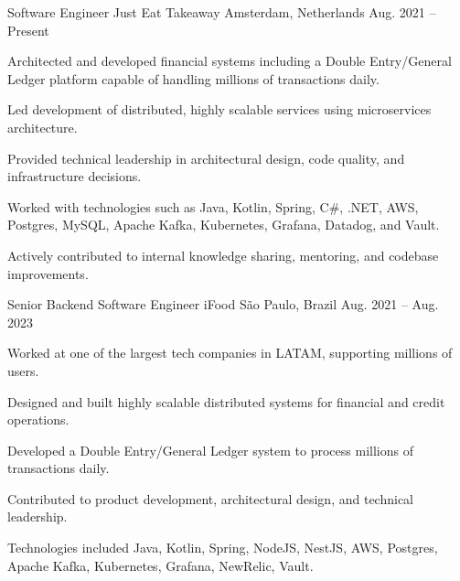 
\begin{cventries}

  \cventry
    {Software Engineer} %
    {Just Eat Takeaway} %
    {Amsterdam, Netherlands} %
    {Aug. 2021 -- Present} %
    {
      \begin{cvitems} %
        \item {Architected and developed financial systems including a Double Entry/General Ledger platform capable of handling millions of transactions daily.}
        \item {Led development of distributed, highly scalable services using microservices architecture.}
        \item {Provided technical leadership in architectural design, code quality, and infrastructure decisions.}
        \item {Worked with technologies such as Java, Kotlin, Spring, C\#, .NET, AWS, Postgres, MySQL, Apache Kafka, Kubernetes, Grafana, Datadog, and Vault.}
        \item {Actively contributed to internal knowledge sharing, mentoring, and codebase improvements.}
      \end{cvitems}
    }

  \cventry
    {Senior Backend Software Engineer} %
    {iFood} %
    {São Paulo, Brazil} %
    {Aug. 2021 -- Aug. 2023} %
    {
      \begin{cvitems} %
        \item {Worked at one of the largest tech companies in LATAM, supporting millions of users.}
        \item {Designed and built highly scalable distributed systems for financial and credit operations.}
        \item {Developed a Double Entry/General Ledger system to process millions of transactions daily.}
        \item {Contributed to product development, architectural design, and technical leadership.}
        \item {Technologies included Java, Kotlin, Spring, NodeJS, NestJS, AWS, Postgres, Apache Kafka, Kubernetes, Grafana, NewRelic, Vault.}
      \end{cvitems}
    }


\end{cventries}
